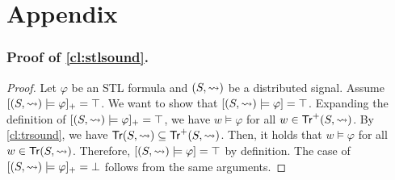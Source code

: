 \section*{Appendix}
\subsubsection{Proof of \cref{cl:stlsound}.}
\begin{proof}
	Let $\varphi$ be an STL formula and $(S,{\rightsquigarrow})$ be a distributed signal.
	Assume $[(S,{\rightsquigarrow}) \models \varphi]_+ = \top$.
	We want to show that $[(S,{\rightsquigarrow}) \models \varphi] = \top$.
	Expanding the definition of $[(S,{\rightsquigarrow}) \models \varphi]_+ = \top$, we have $w \models \varphi$ for all $w \in \mathsf{Tr}^+(S,{\rightsquigarrow})$.
	By \cref{cl:trsound}, we have $\mathsf{Tr}(S,{\rightsquigarrow}) \subseteq \mathsf{Tr}^+(S,{\rightsquigarrow})$.
	Then, it holds that $w \models \varphi$ for all $w \in \mathsf{Tr}(S,{\rightsquigarrow})$.
	Therefore, $[(S,{\rightsquigarrow}) \models \varphi] = \top$ by definition.
	The case of $[(S,{\rightsquigarrow}) \models \varphi]_+ = \bot$ follows from the same arguments.
\end{proof}

